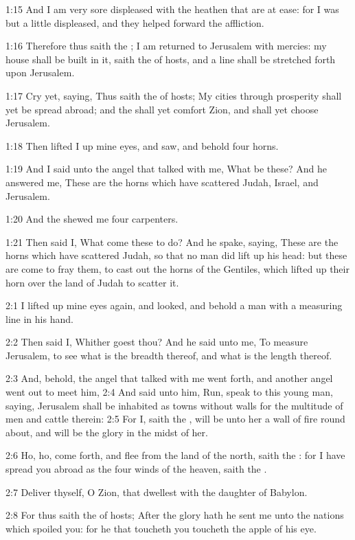 1:15 And I am very sore displeased with the heathen that are at ease:
for I was but a little displeased, and they helped forward the
affliction.

1:16 Therefore thus saith the \LORD; I am returned to Jerusalem with
mercies: my house shall be built in it, saith the \LORD of hosts, and a
line shall be stretched forth upon Jerusalem.

1:17 Cry yet, saying, Thus saith the \LORD of hosts; My cities through
prosperity shall yet be spread abroad; and the \LORD shall yet comfort
Zion, and shall yet choose Jerusalem.

1:18 Then lifted I up mine eyes, and saw, and behold four horns.

1:19 And I said unto the angel that talked with me, What be these? And
he answered me, These are the horns which have scattered Judah,
Israel, and Jerusalem.

1:20 And the \LORD shewed me four carpenters.

1:21 Then said I, What come these to do? And he spake, saying, These
are the horns which have scattered Judah, so that no man did lift up
his head: but these are come to fray them, to cast out the horns of
the Gentiles, which lifted up their horn over the land of Judah to
scatter it.

2:1 I lifted up mine eyes again, and looked, and behold a man with a
measuring line in his hand.

2:2 Then said I, Whither goest thou? And he said unto me, To measure
Jerusalem, to see what is the breadth thereof, and what is the length
thereof.

2:3 And, behold, the angel that talked with me went forth, and another
angel went out to meet him, 2:4 And said unto him, Run, speak to this
young man, saying, Jerusalem shall be inhabited as towns without walls
for the multitude of men and cattle therein: 2:5 For I, saith the
\LORD, will be unto her a wall of fire round about, and will be the
glory in the midst of her.

2:6 Ho, ho, come forth, and flee from the land of the north, saith the
\LORD: for I have spread you abroad as the four winds of the heaven,
saith the \LORD.

2:7 Deliver thyself, O Zion, that dwellest with the daughter of
Babylon.

2:8 For thus saith the \LORD of hosts; After the glory hath he sent me
unto the nations which spoiled you: for he that toucheth you toucheth
the apple of his eye.

